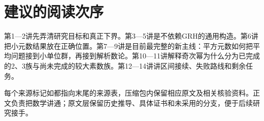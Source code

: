 \section*{建议的阅读次序}
第1—2讲先弄清研究目标和真正下界。第3—5讲是不依赖GRH的通用构造。第6讲把小元数结果放在正确位置。第7—9讲是目前最完整的新主线：平方元数如何把平均问题接到小单位群，再接到解析数论。第10—11讲解释奇次幂为什么分为已完成的2、3族与尚未完成的较大素数族。第12—14讲讲区间接续、失败路线和剩余任务。

每个来源标记如都指向末尾的来源表，压缩包内保留相应原文及相关核验资料。正文负责把数学讲通；原文层保留历史推导、具体证书和未采用的分支，便于后续研究接手。

\tableofcontents\mainmatter
